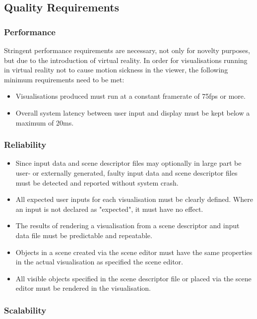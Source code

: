 \documentclass[a4paper,12pt]{article}
\begin{document}
\subsection{Quality Requirements}
	
	\subsubsection{Performance}
	
		Stringent performance requirements are necessary, not only for novelty purposes, but due to the introduction of virtual reality. In order for visualisations running in virtual reality not to cause motion sickness in the viewer, the following minimum requirements need to be met:
		
		\begin{itemize}
			\item Visualisations produced must run at a constant framerate of 75fps or more.
			\item Overall system latency between user input and display must be kept below a maximum of 20ms.
		\end{itemize}
	
	\subsubsection{Reliability}
	
		\begin{itemize}
			\item Since input data and scene descriptor files may optionally in large part be user- or externally generated, faulty input data and scene descriptor files must be detected and reported without system crash.
			\item All expected user inputs for each visualisation must be clearly defined. Where an input is not declared as "expected", it must have no effect.
			\item The results of rendering a visualisation from a scene descriptor and input data file must be predictable and repeatable. 
			\item Objects in a scene created via the scene editor must have the same properties in the actual visualisation as specified the scene editor.
			\item All visible objects specified in the scene descriptor file or placed via the scene editor must be rendered in the visualisation.
		\end{itemize}
		
	\subsubsection{Scalability}
	
\end{document}
